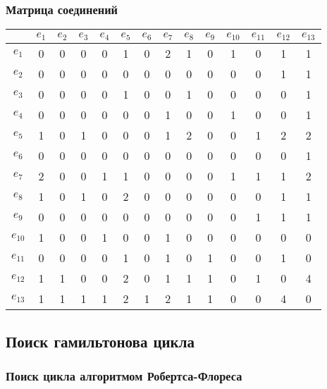 \documentclass[12pt, a4paper] {ncc}
\begin{document}
\subsubsection{Матрица соединений}

\begin{longtable}{|c|c|c|c|c|c|c|c|c|c|c|c|c|c|}
\hline
&$e_{1}$&$e_{2}$&$e_{3}$&$e_{4}$&$e_{5}$&$e_{6}$&$e_{7}$&$e_{8}$&$e_{9}$&$e_{10}$&$e_{11}$&$e_{12}$&$e_{13}$\\
\hline
$e_{1}$  & 0&0&0&0&1&0&2&1&0&1&0&1&1 \\ \hline 
$e_{2}$  & 0&0&0&0&0&0&0&0&0&0&0&1&1 \\ \hline 
$e_{3}$  & 0&0&0&0&1&0&0&1&0&0&0&0&1 \\ \hline 
$e_{4}$  & 0&0&0&0&0&0&1&0&0&1&0&0&1 \\ \hline 
$e_{5}$  & 1&0&1&0&0&0&1&2&0&0&1&2&2 \\ \hline 
$e_{6}$  & 0&0&0&0&0&0&0&0&0&0&0&0&1 \\ \hline 
$e_{7}$  & 2&0&0&1&1&0&0&0&0&1&1&1&2 \\ \hline 
$e_{8}$  & 1&0&1&0&2&0&0&0&0&0&0&1&1 \\ \hline 
$e_{9}$  & 0&0&0&0&0&0&0&0&0&0&1&1&1 \\ \hline 
$e_{10}$ & 1&0&0&1&0&0&1&0&0&0&0&0&0 \\ \hline 
$e_{11}$ & 0&0&0&0&1&0&1&0&1&0&0&1&0 \\ \hline 
$e_{12}$ & 1&1&0&0&2&0&1&1&1&0&1&0&4 \\ \hline 
$e_{13}$ & 1&1&1&1&2&1&2&1&1&0&0&4&0 \\ \hline 
\end{longtable}

\subsection{Поиск гамильтонова цикла}

\subsubsection{Поиск цикла алгоритмом Робертса-Флореса}
\end{document}
